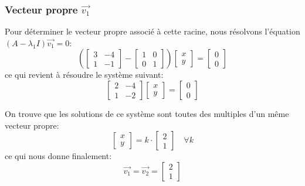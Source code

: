             \subsubsection{Vecteur propre $\overrightarrow{v_1}$}  
                Pour déterminer le vecteur propre associé à cette racine, nous résolvons l'équation $(A - \lambda_1 I)\overrightarrow{v_1}=0$:
                \begin{equation}
                    \left( \begin{bmatrix} 3 & -4 \\ 1 & -1 \end{bmatrix} - \begin{bmatrix} 1 & 0 \\ 0 & 1 \end{bmatrix} \right) \begin{bmatrix} x \\ y \end{bmatrix}=\begin{bmatrix} 0 \\ 0 \end{bmatrix}
                \end{equation}
                ce qui revient à résoudre le système suivant:
                \begin{equation}
                    \begin{bmatrix} 2 & -4 \\ 1 & -2 \end{bmatrix} \begin{bmatrix} x \\ y \end{bmatrix}=\begin{bmatrix} 0 \\ 0 \end{bmatrix}
                \end{equation}
                
                On trouve que les solutions de ce système sont toutes des multiples d'un même vecteur propre:
                \begin{equation}
                    \begin{bmatrix} x \\ y \end{bmatrix}=k \cdot \begin{bmatrix} 2 \\ 1 \end{bmatrix} \quad \forall k
                \end{equation}
                ce qui nous donne finalement:
                \begin{equation}
                    \overrightarrow{v_1}=\overrightarrow{v_2}=\begin{bmatrix} 2 \\ 1 \end{bmatrix}
                \end{equation}
            
